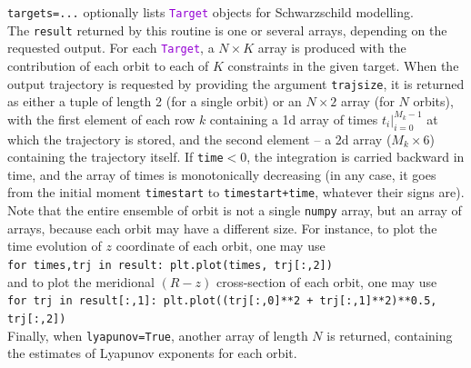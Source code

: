 \documentclass[12pt]{article}
\newcommand{\ttt}[1]{\textcolor{darkviolet}{\texttt{#1}}}
\newcommand{\ppp}[1]{\textcolor{darkolive} {\texttt{#1}}}
\begin{document}
\ppp{targets=...} optionally lists \ttt{Target} objects for Schwarzschild modelling. \\[2mm]
The \texttt{result} returned by this routine is one or several arrays, depending on the requested output. For each \ttt{Target}, a $N\times K$ array is produced with the contribution of each orbit to each of $K$ constraints in the given target. When the output trajectory is requested by providing the argument \ppp{trajsize}, it is returned as either a tuple of length 2 (for a single orbit) or an $N\times 2$ array (for $N$ orbits), with the first element of each row $k$ containing a 1d array of times $t_i |_{i=0}^{M_k-1}$ at which the trajectory is stored, and the second element -- a 2d array ($M_k\times6$) containing the trajectory itself. If \texttt{time}$<0$, the integration is carried backward in time, and the array of times is monotonically decreasing (in any case, it goes from the initial moment \texttt{timestart} to \texttt{timestart+time}, whatever their signs are).
Note that the entire ensemble of orbit is not a single \texttt{numpy} array, but an array of arrays, because each orbit may have a different size.
For instance, to plot the time evolution of $z$ coordinate of each orbit, one may use\\[1mm]
\texttt{for times,trj in result: plt.plot(times, trj[:,2])}\\[1mm]
and to plot the meridional $(R-z)$ cross-section of each orbit, one may use\\[1mm]
\texttt{for trj in result[:,1]: plt.plot((trj[:,0]**2 + trj[:,1]**2)**0.5, trj[:,2])}\\[1mm]
Finally, when \texttt{lyapunov=True}, another array of length $N$ is returned, containing the estimates of Lyapunov exponents for each orbit.
\end{document}
